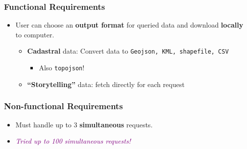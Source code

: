 \documentclass[xcolor=table]{beamer}
\begin{document}
\begin{frame}
	\frametitle{Functional Requirements}
	\begin{itemize}
		\item User can choose an \textbf{output format} for queried data and 
		download \textbf{locally} to computer. 
		\begin{itemize}
			\item \textbf{Cadastral} data: Convert data to \texttt{Geojson, 
			KML, shapefile, CSV}
			\begin{itemize}
				\item<2-> Also \texttt{topojson}! %
			\end{itemize}
			\item \textbf{``Storytelling''} data: fetch directly for each 
			request
		\end{itemize}
	\end{itemize}
\end{frame}

\begin{frame}
	\frametitle{Non-functional Requirements}
	\begin{itemize}
		\item Must handle up to 3 \textbf{simultaneous} requests. \\ 
		\item <2-> \textcolor{purple}{\textit{Tried up to 100 
		simultaneous requests!}}
	\end{itemize}
\end{frame}
\end{document}
